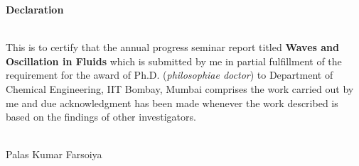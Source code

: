 \begin{center}
\textbf{\large Declaration} 
\end{center}
\indent \\
\indent This is to certify that the annual progress seminar report titled \textbf{Waves and Oscillation in Fluids}  which is submitted by me in partial fulfillment of the 
requirement for the award of Ph.D. (\textit{philosophiae doctor}) to Department of Chemical Engineering, IIT Bombay, Mumbai comprises the work carried out by me and
due acknowledgment has been made whenever the work described is based on the findings of other investigators.

\vspace*{1.6cm}

\begin{flushleft}
\underline{\hspace{4cm}}\\
Palas Kumar Farsoiya\\
\end{flushleft}
